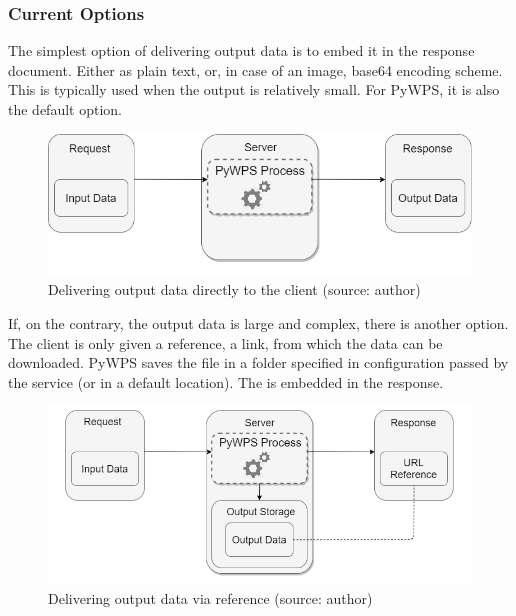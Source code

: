 \subsubsection{Current Options} 

The simplest option of delivering output data is to embed it in the
 response document. Either as plain text,  or, in case
of an image, base64 encoding scheme. This is typically used when the output is
relatively small. For PyWPS, it is also the default option.

\begin{figure}[H] \centering
  \includegraphics[width=350pt]{./pictures/optionone.png}
      \caption[Delivering output data directly to the client]{Delivering output data directly to the client (source: {author})}
      \label{fig:optionone}
  \end{figure}
  

  If, on the contrary, the output data is large and complex, there is
  another option. The client is only given a reference, a 
  link, from which the data can be downloaded. PyWPS saves the file in
  a folder specified in configuration passed by the service (or in a
  default location). The  is embedded in the 
  response. \cite{pywpsurl}

  
\begin{figure}[H] \centering
  \includegraphics[width=370pt]{./pictures/optiontwo.png}
      \caption[Delivering output data via  reference]{Delivering output data via  reference (source: {author})}
      \label{fig:optiontwo}
  \end{figure}

